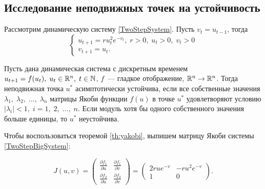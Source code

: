         \subsection{Исследование неподвижных точек на устойчивость}

            Рассмотрим динамическую систему \ref{TwoStepSystem}. Пусть $v_t = u_{t-1}$, тогда
            \begin{equation}\label{TwoStepBigSystem}
                \left\{
                    \begin{array}{ll}
                        u_{t+1} = r u^2_t e^{-v_t},\; r > 0,\; u_t > 0,\; v_t > 0 \\
                        v_{t+1} = u_t.
                    \end{array}
                \right.
            \end{equation}
            \begin{theorem}\label{th:yakobi}
                Пусть дана динамическая система с дискретным временем $u_{t+1}=f(u_t),\;u_t\in\mathbb{R}^n,\;t\in\mathbb{N}$, $f$~--- гладкое отображение, $\mathbb{R}^n\rightarrow\mathbb{R}^n$. Тогда неподвижная точка $u^*$ асимптотически устойчива, если все собственные значения $\lambda_1,\;\lambda_2,\;\ldots,\;\lambda_n$ матрицы Якоби функции $f(u)$ в точке $u^*$ удовлетворяют условию $|\lambda_i|<1,\;i = 1,\;2,\;\ldots,\;n$. Если модуль хотя бы одного собственного значения больше единицы, то $u^*$ неустойчива.
            \end{theorem}

            Чтобы воспользоваться теоремой \ref{th:yakobi}, выпишем матрицу Якоби системы \ref{TwoStepBigSystem}:

            $$
                J(u, v)
                = 
                \begin{pmatrix}
                        \frac{\partial f_1}{\partial u} &
                        \frac{\partial f_1}{\partial v} \\
                        \frac{\partial f_2}{\partial u} &
                        \frac{\partial f_2}{\partial v} 
                \end{pmatrix}
                =
                \begin{pmatrix}
                        2rue^{-v}
                        & 
                        -ru^2e^{-v}
                        \\
                        1
                        &
                        0 
                \end{pmatrix}.
            $$


